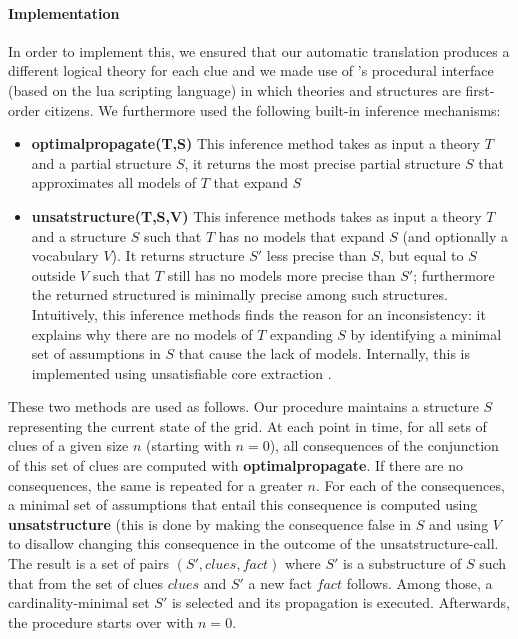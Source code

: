 \paragraph{Implementation}
In order to implement this, we ensured that our automatic translation produces a different logical theory for each clue and we made use of \idp's procedural interface (based on the lua scripting language) in which theories and structures are first-order citizens. 
We furthermore used the following built-in inference mechanisms: 
\begin{itemize}
 \item \textbf{optimalpropagate(T,S)} This inference method takes as input a theory $T$ and a partial structure $S$, it returns the most precise partial structure $S$ that approximates all models of $T$ that expand $S$
 \item \textbf{unsatstructure(T,S,V)} This inference methods takes as input a theory $T$ and a structure $S$ such that $T$ has no models that expand $S$ (and optionally a vocabulary $V$). It returns structure $S'$ less precise than $S$, but equal to $S$ outside $V$ such that $T$ still has no models more precise than $S'$; furthermore the returned structured is minimally precise among such structures. Intuitively, this inference methods finds the reason for an inconsistency: it explains why there are no models of $T$ expanding $S$ by identifying a minimal set of assumptions in $S$ that cause the lack of models. 
 Internally, this is implemented using unsatisfiable core extraction \cite{conf/sat/LynceM04}. 
\end{itemize}

These two methods are used as follows. Our procedure maintains a structure $S$ representing the current state of the grid. 
At each point in time, for all sets of clues of a given size $n$ (starting with $n=0$), all consequences of the conjunction of this set of clues are computed with \textbf{optimalpropagate}. 
If there are no consequences, the same is repeated for a greater $n$. 
For each of the consequences, a minimal set of assumptions that entail this consequence is computed using \textbf{unsatstructure} (this is done by making the consequence false in $S$ and using $V$ to disallow changing this consequence in the outcome of the unsatstructure-call. 
The result is a set of pairs $(S',\mathit{clues},\mathit{fact})$ where $S'$ is a substructure of $S$ such that from the set of clues $\mathit{clues}$ and $S'$ a new fact $\mathit{fact}$ follows. Among those, a cardinality-minimal set $S'$ is selected and its propagation is executed. 
Afterwards, the procedure starts over with $n=0$. 

